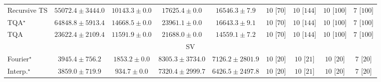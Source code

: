 \begin{tabular}{l|cccc|cccc|}
Recursive TS & {\cellcolor[HTML]{14783E}} \color[HTML]{F1F1F1} $55072.4\pm 3444.0$ & {\cellcolor[HTML]{FFFFE5}} \color[HTML]{000000} $10143.3\pm 0.0$ & {\cellcolor[HTML]{F5FBB8}} \color[HTML]{000000} $17625.4\pm 0.0$ & {\cellcolor[HTML]{F8FCBD}} \color[HTML]{000000} $16546.3\pm 7.9$ & {\cellcolor[HTML]{49006A}} \color[HTML]{F1F1F1} $10$ [$70$] & {\cellcolor[HTML]{49006A}} \color[HTML]{F1F1F1} $10$ [$144$] & {\cellcolor[HTML]{49006A}} \color[HTML]{F1F1F1} $10$ [$100$] & {\cellcolor[HTML]{CD238F}} \color[HTML]{F1F1F1} $7$ [$100$] \\
TQA$^\star$ & {\cellcolor[HTML]{004A2B}} \color[HTML]{F1F1F1} $64848.8\pm 5913.4$ & {\cellcolor[HTML]{FAFDC9}} \color[HTML]{000000} $14668.5\pm 0.0$ & {\cellcolor[HTML]{DAF0A4}} \color[HTML]{000000} $23961.1\pm 0.0$ & {\cellcolor[HTML]{F8FCBD}} \color[HTML]{000000} $16643.3\pm 9.1$ & {\cellcolor[HTML]{49006A}} \color[HTML]{F1F1F1} $10$ [$70$] & {\cellcolor[HTML]{49006A}} \color[HTML]{F1F1F1} $10$ [$144$] & {\cellcolor[HTML]{49006A}} \color[HTML]{F1F1F1} $10$ [$100$] & {\cellcolor[HTML]{CD238F}} \color[HTML]{F1F1F1} $7$ [$100$] \\
TQA & {\cellcolor[HTML]{DCF1A5}} \color[HTML]{000000} $23622.4\pm 2109.4$ & {\cellcolor[HTML]{FDFEDD}} \color[HTML]{000000} $11591.9\pm 0.0$ & {\cellcolor[HTML]{E4F4AB}} \color[HTML]{000000} $21688.0\pm 0.0$ & {\cellcolor[HTML]{FAFDC9}} \color[HTML]{000000} $14559.1\pm 7.2$ & {\cellcolor[HTML]{49006A}} \color[HTML]{F1F1F1} $10$ [$70$] & {\cellcolor[HTML]{49006A}} \color[HTML]{F1F1F1} $10$ [$144$] & {\cellcolor[HTML]{49006A}} \color[HTML]{F1F1F1} $10$ [$100$] & {\cellcolor[HTML]{CD238F}} \color[HTML]{F1F1F1} $7$ [$100$] \\
\cline{1-9}
\multicolumn{9}{c}{\rule{0pt}{8pt}SV} \\
\midrule
Fourier$^\star$ & {\cellcolor[HTML]{9CB9D9}} \color[HTML]{000000} $3945.4\pm 756.2$ & {\cellcolor[HTML]{EDE7F2}} \color[HTML]{000000} $1853.2\pm 0.0$ & {\cellcolor[HTML]{023C5F}} \color[HTML]{F1F1F1} $8305.3\pm 3734.0$ & {\cellcolor[HTML]{04629A}} \color[HTML]{F1F1F1} $7126.2\pm 2801.9$ & {\cellcolor[HTML]{49006A}} \color[HTML]{F1F1F1} $10$ [$20$] & {\cellcolor[HTML]{49006A}} \color[HTML]{F1F1F1} $10$ [$21$] & {\cellcolor[HTML]{49006A}} \color[HTML]{F1F1F1} $10$ [$20$] & {\cellcolor[HTML]{CD238F}} \color[HTML]{F1F1F1} $7$ [$20$] \\
Interp.$^\star$ & {\cellcolor[HTML]{A1BBDA}} \color[HTML]{000000} $3859.0\pm 719.9$ & {\cellcolor[HTML]{FFF7FB}} \color[HTML]{000000} $934.7\pm 0.0$ & {\cellcolor[HTML]{045E93}} \color[HTML]{F1F1F1} $7320.4\pm 2999.7$ & {\cellcolor[HTML]{0C74B2}} \color[HTML]{F1F1F1} $6426.5\pm 2497.8$ & {\cellcolor[HTML]{49006A}} \color[HTML]{F1F1F1} $10$ [$20$] & {\cellcolor[HTML]{49006A}} \color[HTML]{F1F1F1} $10$ [$21$] & {\cellcolor[HTML]{49006A}} \color[HTML]{F1F1F1} $10$ [$20$] & {\cellcolor[HTML]{CD238F}} \color[HTML]{F1F1F1} $7$ [$20$] \\

\end{tabular}
